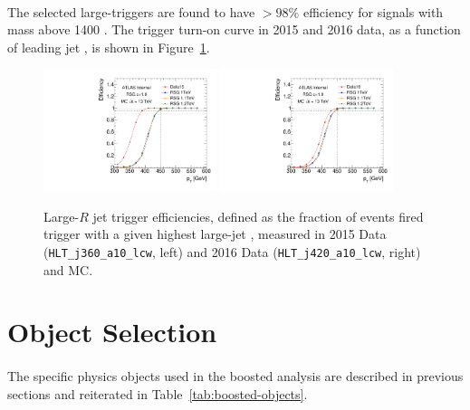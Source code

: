 \paragraph{}
The selected large-\R triggers are found to have $>98\%$ efficiency for signals with mass above 1400 \GeV.
The trigger turn-on curve in 2015 and 2016 data, as a function of leading jet \pt, is shown in Figure~\ref{fig:boosted-trigger-HLT-turnon}.
\begin{figure}[htbp!]
\begin{center}
  \includegraphics[width=0.45\textwidth,angle=-90]{figures/boosted/Trigger/trig_15_b77_pT_Efficiency.pdf}
  \includegraphics[width=0.45\textwidth,angle=-90]{figures/boosted/Trigger/trig_16_b77_pT_Efficiency.pdf}
  \caption{Large-$R$ jet trigger efficiencies, defined as the fraction of events fired trigger with a given highest large-\R jet \pt, measured in 2015 Data (\texttt{HLT\_j360\_a10\_lcw}, left) and 2016 Data (\texttt{HLT\_j420\_a10\_lcw}, right) and MC.}
  \label{fig:boosted-trigger-HLT-turnon}
\end{center}
\end{figure}


\section{Object Selection}
\paragraph{}
The specific physics objects used in the boosted analysis are described in previous sections and reiterated in Table~\ref{tab:boosted-objects}.

